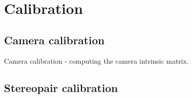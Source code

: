 \chapter{Calibration}
\label{chapter:calibration}

\section{Camera calibration}

Camera calibration - computing the camera intrinsic matrix.

\section{Stereopair calibration}
